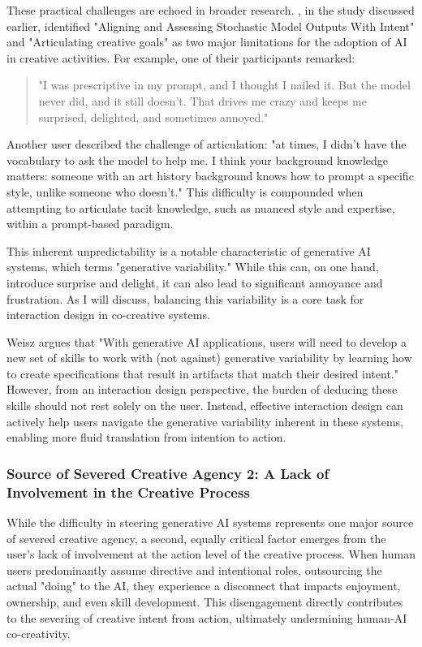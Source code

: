 These practical challenges are echoed in broader research. \cite{Palani2024-on}, in the study discussed earlier, identified "Aligning and Assessing Stochastic Model Outputs With Intent" and "Articulating creative goals" as two major limitations for the adoption of AI in creative activities. For example, one of their participants remarked:
\begin{quote}
"I was prescriptive in my prompt, and I thought I nailed it. But the model never did, and it still doesn't. That drives me crazy and keeps me surprised, delighted, and sometimes annoyed."
\end{quote}
Another user described the challenge of articulation: "at times, I didn't have the vocabulary to ask the model to help me. I think your background knowledge matters: someone with an art history background knows how to prompt a specific style, unlike someone who doesn't." This difficulty is compounded when attempting to articulate tacit knowledge, such as nuanced style and expertise, within a prompt-based paradigm.

This inherent unpredictability is a notable characteristic of generative AI systems, which \cite{Weisz2024-io} terms "generative variability." While this can, on one hand, introduce surprise and delight, it can also lead to significant annoyance and frustration. As I will discuss, balancing this variability is a core task for interaction design in co-creative systems.

Weisz argues that "With generative AI applications, users will need to develop a new set of skills to work with (not against) generative variability by learning how to create specifications that result in artifacts that match their desired intent." However, from an interaction design perspective, the burden of deducing these skills should not rest solely on the user. Instead, effective interaction design can actively help users navigate the generative variability inherent in these systems, enabling more fluid translation from intention to action.

\subsubsection{Source of Severed Creative Agency 2: A Lack of Involvement in the Creative Process}

While the difficulty in steering generative AI systems represents one major source of severed creative agency, a second, equally critical factor emerges from the user's lack of involvement at the action level of the creative process. When human users predominantly assume directive and intentional roles, outsourcing the actual "doing" to the AI, they experience a disconnect that impacts enjoyment, ownership, and even skill development. This disengagement directly contributes to the severing of creative intent from action, ultimately undermining human-AI co-creativity.

